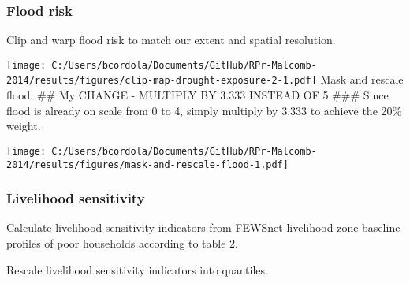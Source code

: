 \documentclass[
]{article}
\begin{document}
\hypertarget{flood-risk}{%
\subsubsection{Flood risk}\label{flood-risk}}

Clip and warp flood risk to match our extent and spatial resolution.

\texttt{[image: C:/Users/bcordola/Documents/GitHub/RPr-Malcomb-2014/results/figures/clip-map-drought-exposure-2-1.pdf]}
Mask and rescale flood. \#\# My CHANGE - MULTIPLY BY 3.333 INSTEAD OF 5
\#\#\# Since flood is already on scale from 0 to 4, simply multiply by
3.333 to achieve the 20\% weight.

\texttt{[image: C:/Users/bcordola/Documents/GitHub/RPr-Malcomb-2014/results/figures/mask-and-rescale-flood-1.pdf]}

\hypertarget{livelihood-sensitivity}{%
\subsubsection{Livelihood sensitivity}\label{livelihood-sensitivity}}

Calculate livelihood sensitivity indicators from FEWSnet livelihood zone
baseline profiles of poor households according to table 2.

Rescale livelihood sensitivity indicators into quantiles.
\end{document}
